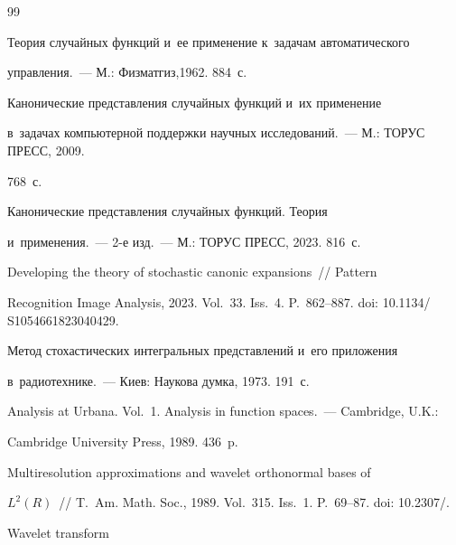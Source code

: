 {\small\frenchspacing


{%




\begin{thebibliography}{99}




 Теория случайных функций и~ее применение к~задачам автоматического 


управления.~--- М.: Физматгиз,1962. 884~с. 




 Канонические представления случайных функций и~их применение 


в~задачах компьютерной поддержки научных исследований.~--- М.: ТОРУС ПРЕСС, 2009. 


768~с.




 Канонические представления случайных функций. Теория 


и~применения.~--- 2-е изд.~--- М.: ТОРУС ПРЕСС, 2023. 816~с.




 Developing the theory of stochastic canonic expansions~/\!\!/ Pattern 


Recognition Image Analysis, 2023. Vol.~33. Iss.~4. P.~862--887.  doi: 10.1134\!/ S1054661823040429.




 Метод стохастических интегральных представлений и~его приложения 


в~радиотехнике.~--- Киев: Наукова думка, 1973. 191~с.




 Analysis at Urbana. Vol.~1. Analysis in function spaces.~--- Cambridge, U.K.: 


Cambridge University Press, 1989. 436~p.




 Multiresolution approximations and wavelet orthonormal bases of 


$L^2(R)$~/\!\!/ T.~Am. Math. Soc., 1989. Vol.~315. Iss.~1. P.~69--87. doi: 10.2307\!/.




 Wavelet transform 



\end{thebibliography}}}
